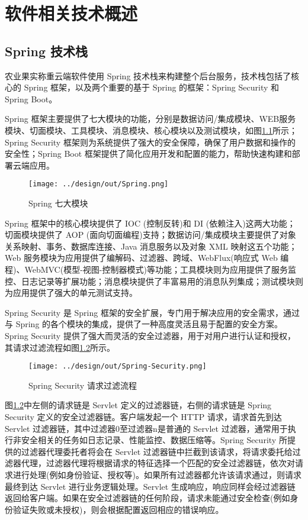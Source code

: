 \chapter{软件相关技术概述}

\section{Spring 技术栈}

农业果实称重云端软件使用 Spring 技术栈来构建整个后台服务，技术栈包括了核心的 Spring 框架，以及两个重要的基于 Spring 的框架：Spring Security 和 Spring Boot。

Spring 框架主要提供了七大模块的功能，分别是数据访问/集成模块、WEB服务模块、切面模块、工具模块、消息模块、核心模块以及测试模块，如图\ref{fig:Spring}所示；Spring Security 框架则为系统提供了强大的安全保障，确保了用户数据和操作的安全性；Spring Boot 框架提供了简化应用开发和配置的能力，帮助快速构建和部署云端应用。

\begin{figure}[H]
    \centering
    \texttt{[image: ../design/out/Spring.png]}
    \caption{Spring 七大模块}
    \label{fig:Spring}
\end{figure}

Spring 框架中的核心模块提供了 IOC (控制反转)和 DI (依赖注入)这两大功能；切面模块提供了 AOP (面向切面编程)支持；数据访问/集成模块主要提供了对象关系映射、事务、数据库连接、Java 消息服务以及对象 XML 映射这五个功能；Web 服务模块为应用提供了编解码、过滤器、跨域、WebFlux(响应式 Web 编程)、WebMVC(模型-视图-控制器模式)等功能；工具模块则为应用提供了服务监控、日志记录等扩展功能；消息模块提供了丰富易用的消息队列集成；测试模块则为应用提供了强大的单元测试支持\cite{Spring-框架概述}。

Spring Security 是 Spring 框架的安全扩展，专门用于解决应用的安全需求，通过与 Spring 的各个模块的集成，提供了一种高度灵活且易于配置的安全方案。Spring Security 提供了强大而灵活的安全过滤器，用于对用户进行认证和授权，其请求过滤流程如图\ref{fig:Spring-Security}所示。

\begin{figure}[H]
    \centering
    \texttt{[image: ../design/out/Spring-Security.png]}
    \caption{Spring Security 请求过滤流程}
    \label{fig:Spring-Security}
\end{figure}

图\ref{fig:Spring-Security}中左侧的请求链是 Servlet 定义的过滤器链，右侧的请求链是 Spring Security 定义的安全过滤器链。客户端发起一个 HTTP 请求，请求首先到达 Servlet 过滤器链，其中过滤器0至过滤器n是普通的 Servlet 过滤器，通常用于执行非安全相关的任务如日志记录、性能监控、数据压缩等。Spring Security 所提供的过滤器代理委托者将会在 Servlet 过滤器链中拦截到该请求，将请求委托给过滤器代理，过滤器代理将根据请求的特征选择一个匹配的安全过滤器链，依次对请求进行处理(例如身份验证、授权等)。如果所有过滤器都允许该请求通过，则请求最终到达 Servlet 进行业务逻辑处理。Servlet 生成响应，响应同样会经过滤器链返回给客户端。如果在安全过滤器链的任何阶段，请求未能通过安全检查(例如身份验证失败或未授权)，则会根据配置返回相应的错误响应\cite{Spring-Security-架构设计}。

